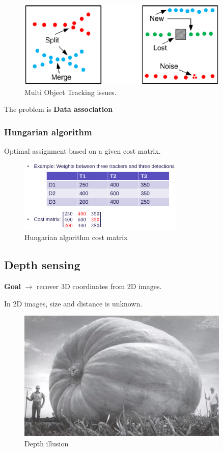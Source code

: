 \documentclass[a4paper]{article}
\begin{document}
\begin{figure}[H]
\centering
\includegraphics[width=0.9\textwidth]{figures/MOT_issues.png}
\caption{Multi Object Tracking issues.}
\label{fig:MOT_issues}
\end{figure} 

The problem is \textbf{Data association} 
\subsubsection{Hungarian algorithm}
Optimal assignment based on a given cost matrix.

\begin{figure}[H]
\centering
\includegraphics[width=0.7\textwidth]{figures/Hungarian_algorithm.png}
\caption{Hungarian algorithm cost matrix}
\label{fig:hungarian_cost_matrix}
\end{figure} 


\newpage
\subsection{Depth sensing}
\textbf{Goal} $ \rightarrow $ recover 3D coordinates from 2D images.

In 2D images, size and distance is unknown.
\begin{figure}[H]
\centering
\includegraphics[width=0.9\textwidth]{figures/Depth_illusion.png}
\caption{Depth illusion}
\label{fig:depth_illusion}
\end{figure} 
\end{document}
